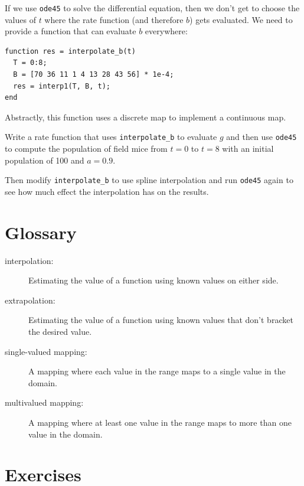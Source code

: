 \documentclass{book}
\begin{document}
If we use {\tt ode45} to solve the differential equation, then we
don't get to choose the values of $t$ where the rate function
(and therefore $b$) gets evaluated. We need to provide a function
that can evaluate $b$ everywhere:

\begin{verbatim}
function res = interpolate_b(t)
  T = 0:8;
  B = [70 36 11 1 4 13 28 43 56] * 1e-4;
  res = interp1(T, B, t);
end
\end{verbatim}

Abstractly, this function uses a discrete map to implement a
continuous map. 

\begin{ex}
Write a rate function that uses
{\tt interpolate\_b} to evaluate $g$ and then
use {\tt ode45} to compute the population of field mice
from $t=0$ to $t=8$ with an initial population of 100 and
$a=0.9$.

Then modify {\tt interpolate\_b} to use spline interpolation
and run {\tt ode45} again to see how much effect the interpolation
has on the results.
\end{ex}

\section{Glossary}

\begin{description}

\item[interpolation:] Estimating the value of a function using
known values on either side.

\item[extrapolation:] Estimating the value of a function using
known values that don't bracket the desired value.

\item[single-valued mapping:] A mapping where each value in the
range maps to a single value in the domain.

\item[multivalued mapping:] A mapping where at least one value in
the range maps to more than one value in the domain.

\end{description}


\section{Exercises}
\end{document}
